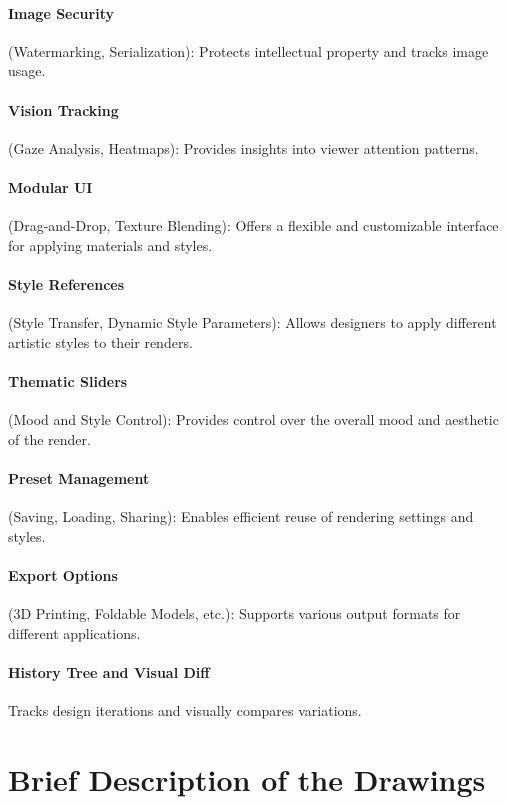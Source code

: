 \documentclass{article}
\begin{document}
\paragraph{Image Security} (Watermarking, Serialization): Protects intellectual property and tracks image usage.

\paragraph{Vision Tracking} (Gaze Analysis, Heatmaps): Provides insights into viewer attention patterns.

\paragraph{Modular UI} (Drag-and-Drop, Texture Blending): Offers a flexible and customizable interface for applying materials and styles.

\paragraph{Style References} (Style Transfer, Dynamic Style Parameters): Allows designers to apply different artistic styles to their renders.

\paragraph{Thematic Sliders} (Mood and Style Control): Provides control over the overall mood and aesthetic of the render.

\paragraph{Preset Management} (Saving, Loading, Sharing): Enables efficient reuse of rendering settings and styles.

\paragraph{Export Options} (3D Printing, Foldable Models, etc.): Supports various output formats for different applications.

\paragraph{History Tree and Visual Diff} Tracks design iterations and visually compares variations.

\section{Brief Description of the Drawings}
\end{document}

